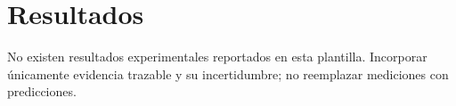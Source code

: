 \section{Resultados} No existen resultados experimentales reportados en esta plantilla. Incorporar únicamente evidencia trazable y su incertidumbre; no reemplazar mediciones con predicciones.
